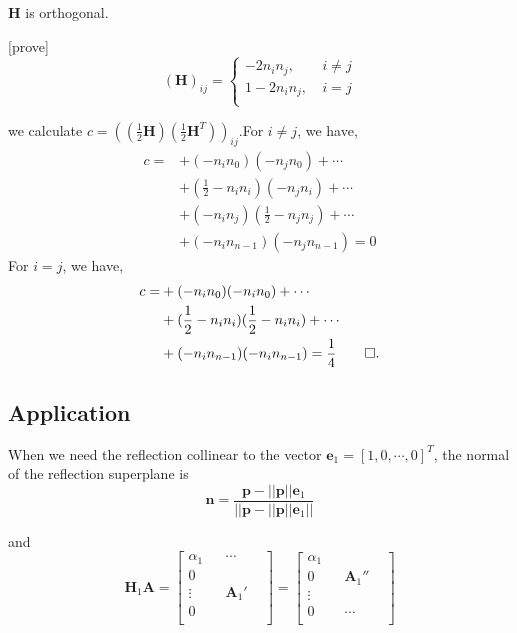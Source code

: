 \documentclass[UTF8]{../../09-Mathematics}
\begin{document}
\begin{lemma}
    $\boldsymbol H$ is orthogonal.

    [prove]
    $$
    (\boldsymbol H)_{ij}=\left\{ 
        \begin{aligned}
        -2 n_in_j,\  & i \neq j\\
        1-2 n_in_j,\  & i = j\\
        \end{aligned}
         \right.
    $$

    we calculate $c =((\frac{1}{2}\boldsymbol H)(\frac{1}{2}\boldsymbol H^T))_{ij} $.For $i \neq j$, we have,
    $$
    \begin{aligned}
        c = &+(-n_in_0)(-n_jn_0)+\cdots\\
        &+(\frac{1}{2}-n_in_i)(-n_jn_i)+\cdots\\
        &+(-n_in_j)(\frac{1}{2}-n_jn_j)+\cdots\\
        &+(-n_in_{n-1})(-n_jn_{n-1})=0
        \end{aligned}
    $$
    For $i =j$, we have,
    $$
    \begin{aligned}
        c = &+(-n_in_0)(-n_in_0)+\cdots\\
        &+(\frac{1}{2}-n_in_i)(\frac{1}{2}-n_in_i)+\cdots\\
        &+(-n_in_{n-1})(-n_in_{n-1})=\frac{1}{4} \qed.
        \end{aligned}
    $$
\end{lemma}





\subsection{Application}

When we need the reflection collinear to the vector $\boldsymbol e_1 = [1,0,\cdots,0]^T$, the normal of the reflection superplane is 
$$
\boldsymbol n = \frac{\boldsymbol p - ||\boldsymbol p || \boldsymbol e_1}{||\boldsymbol p - ||\boldsymbol p || \boldsymbol e_1||}
$$

and 
$$
\boldsymbol H_1 \boldsymbol A = 
\begin{bmatrix}
\alpha _1& & \cdots &\\
0& &  &\\
\vdots& & \boldsymbol A_1' &\\
0& &  &\\
\end{bmatrix}
= 
\begin{bmatrix}
\alpha _1& & &\\
0& &  \boldsymbol A_1''&\\
\vdots& &  &\\
0& &   \cdots&\\
\end{bmatrix}
$$
\end{document}
